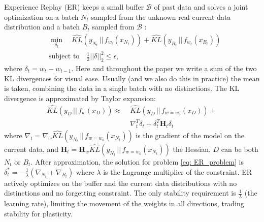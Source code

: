 Experience Replay (ER) \cite{chaudhry2019continual} keeps a small buffer $\mathcal{B}$ of past data and solves a joint optimization on a batch $N_t$ sampled from the unknown real current data distribution and a batch $B_t$ sampled from $\mathcal{B}$ :
\begin{equation}
\label{eq: ER_problem}
\begin{aligned}
& \min_{\delta_t} \quad \hat{KL}(y_{N_t} \, || \, f_{w_t}(x_{N_t})) +  \hat{KL}(y_{B_t} \, || \, f_{w_t}(x_{B_t}))\\
& \text{subject to} \quad \frac{1}{2}||\delta||_2^2 \leq \epsilon, 
\end{aligned}
\end{equation}
where $\delta_t = w_t - w_{t-1}$. Here and throughout the paper we write a sum of the two KL divergences for visual ease. Usually (and we also do this in practice) the mean is taken, combining the data in a single batch with no distinctions. The KL divergence is approximated by Taylor expansion:
\begin{align*}
    \hat{KL}(y_{D} \, || \, f_w(x_{D})) \approx  \; &\hat{KL}(y_{D} \, || \, f_{w = w_0}(x_{D})) + \\ &\nabla_{t}^T \delta_t + \delta_t^T \mathbf{H}_{t} \delta_t
\end{align*}
where $\nabla_t = \nabla_w \hat{KL}(y_{N_t} \, || \, f_{w = w_0}(x_{N_t}))$ is the gradient of the model on the current data, and $\mathbf{H}_{t} = \mathbf{H}_w \hat{KL}(y_{N_t} \, || \, f_{w = w_0}(x_{N_t}))$ the Hessian. $D$ can be both $N_t$ or $B_t$. After approximation, the solution for problem \ref{eq: ER_problem} is $\delta_t^* = -\frac{1}{\lambda} (\nabla_{N_t} + \nabla_{B_t})$ where $\lambda$ is the Lagrange multiplier of the constraint. ER actively optimizes on the buffer and the current data distributions with no distinctions and no forgetting constraint. The only stability requirement is $\frac{1}{\lambda}$ (the learning rate), limiting the movement of the weights in all directions, trading stability for plasticity.

